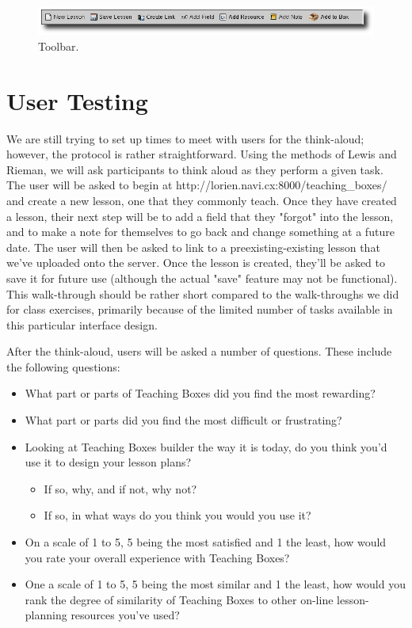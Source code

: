 \documentclass[10pt,letter]{article}
\begin{document}
\begin{figure}[htb]
	\centering
	\includegraphics[width=0.9\linewidth]{figures/toolbar}
	\caption{Toolbar.}
	\label{fig: toolbar ss}
\end{figure}

\section{User Testing}
We are still trying to set up times to meet with users for the think-aloud;
however, the protocol is rather straightforward.  Using the methods of Lewis and
Rieman, we will ask participants to think aloud as they perform a given task.
The user will be asked to begin at http://lorien.navi.cx:8000/teaching\_boxes/
and create a new lesson, one that they commonly teach.  Once they have created a
lesson, their next step will be to add a field that they "forgot" into the
lesson, and to make a note for themselves to go back and change something at a
future date.  The user will then be asked to link to a preexisting-existing lesson that
we've uploaded onto the server.  Once the lesson is created, they'll be asked to
save it for future use (although the actual "save" feature may not be
functional).  This walk-through should be rather short compared to the
walk-throughs we did for class exercises, primarily because of the limited
number of tasks available in this particular interface design.

After the think-aloud, users will be asked a number of questions.  These include
the following questions:

\begin{itemize}
\item What part or parts of Teaching Boxes did you find the most rewarding?
\item What part or parts did you find the most difficult or frustrating?
\item Looking at Teaching Boxes builder the way it is today, do you think you'd
      use it to design your lesson plans?
	  \begin{itemize}
	  \item If so, why, and if not, why not?
	  \item If so, in what ways do you think you would you use it?
	  \end{itemize}
\item On a scale of 1 to 5, 5 being the most satisfied and 1 the least, how
      would you rate your overall experience with Teaching Boxes?
\item One a scale of 1 to 5, 5 being the most similar and 1 the least, how would
      you rank the degree of similarity of Teaching Boxes to other on-line
      lesson-planning resources you've used?
\end{itemize}
\end{document}
